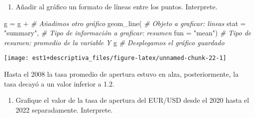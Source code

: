 \documentclass[
]{book}
\newenvironment{Shaded}{\begin{snugshade}}{\end{snugshade}}
\newcommand{\AttributeTok}[1]{\textcolor[rgb]{0.77,0.63,0.00}{#1}}
\newcommand{\CommentTok}[1]{\textcolor[rgb]{0.56,0.35,0.01}{\textit{#1}}}
\newcommand{\FunctionTok}[1]{\textcolor[rgb]{0.00,0.00,0.00}{#1}}
\newcommand{\NormalTok}[1]{#1}
\newcommand{\OtherTok}[1]{\textcolor[rgb]{0.56,0.35,0.01}{#1}}
\newcommand{\SpecialCharTok}[1]{\textcolor[rgb]{0.00,0.00,0.00}{#1}}
\newcommand{\StringTok}[1]{\textcolor[rgb]{0.31,0.60,0.02}{#1}}
\providecommand{\tightlist}{%
  \setlength{\itemsep}{0pt}\setlength{\parskip}{0pt}}
\begin{document}
\begin{enumerate}
\def\labelenumi{\arabic{enumi}.}
\setcounter{enumi}{1}
\tightlist
\item
  Añadir al gráfico un formato de líneas entre los puntos. Interprete.
\end{enumerate}

\begin{Shaded}
\begin{Highlighting}[]
\NormalTok{g }\OtherTok{=}\NormalTok{ g }\SpecialCharTok{+} \CommentTok{\# Añadimos otro gráfico}
  \FunctionTok{geom\_line}\NormalTok{( }\CommentTok{\# Objeto a graficar: lineas}
    \AttributeTok{stat =} \StringTok{"summary"}\NormalTok{, }\CommentTok{\# Tipo de información a graficar: resumen}
    \AttributeTok{fun =} \StringTok{"mean"}\NormalTok{) }\CommentTok{\# Tipo de resumen: promedio de la variable Y}
\NormalTok{g }\CommentTok{\# Desplegamos el gráfico guardado}
\end{Highlighting}
\end{Shaded}

\begin{center}\texttt{[image: est1+descriptiva\_files/figure-latex/unnamed-chunk-22-1]} \end{center}

Hasta el 2008 la tasa promedio de apertura estuvo en alza, posteriormente, la tasa decayó a un valor inferior a 1.2.

\begin{enumerate}
\def\labelenumi{\arabic{enumi}.}
\setcounter{enumi}{2}
\tightlist
\item
  Grafique el valor de la tasa de apertura del EUR/USD desde el 2020 hasta el 2022 separadamente. Interprete.
\end{enumerate}
\end{document}

